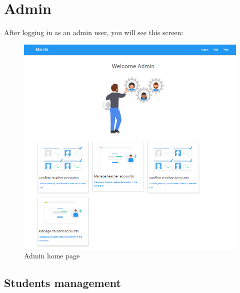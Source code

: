 \documentclass[ManualeUtente]{subfiles}
\begin{document}
	
	\chapter{Admin}
	After logging in as an admin user, you will see this screen:
	\begin{figure}[H]
		\centering
		\includegraphics[width=1\linewidth]{image/Admin}
		\caption[Admin home page]{Admin home page}
		\label{fig:universityaddamin}
	\end{figure}
	
	\section{Students management}
\end{document}
